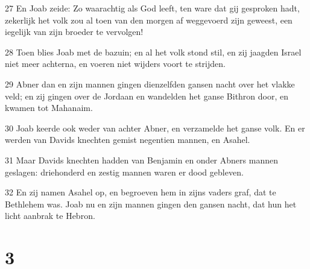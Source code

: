 \par 27 En Joab zeide: Zo waarachtig als God leeft, ten ware dat gij gesproken hadt, zekerlijk het volk zou al toen van den morgen af weggevoerd zijn geweest, een iegelijk van zijn broeder te vervolgen!
\par 28 Toen blies Joab met de bazuin; en al het volk stond stil, en zij jaagden Israel niet meer achterna, en voeren niet wijders voort te strijden.
\par 29 Abner dan en zijn mannen gingen dienzelfden gansen nacht over het vlakke veld; en zij gingen over de Jordaan en wandelden het ganse Bithron door, en kwamen tot Mahanaim.
\par 30 Joab keerde ook weder van achter Abner, en verzamelde het ganse volk. En er werden van Davids knechten gemist negentien mannen, en Asahel.
\par 31 Maar Davids knechten hadden van Benjamin en onder Abners mannen geslagen: driehonderd en zestig mannen waren er dood gebleven.
\par 32 En zij namen Asahel op, en begroeven hem in zijns vaders graf, dat te Bethlehem was. Joab nu en zijn mannen gingen den gansen nacht, dat hun het licht aanbrak te Hebron.

\chapter{3}

